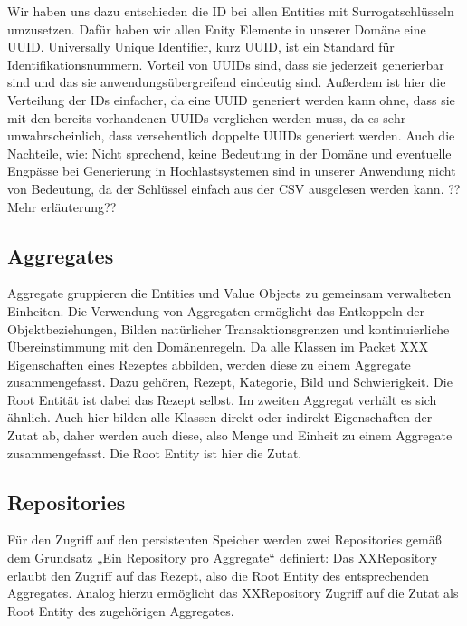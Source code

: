 Wir haben uns dazu entschieden die ID bei allen Entities mit Surrogatschlüsseln umzusetzen. Dafür haben wir allen Enity Elemente in unserer Domäne eine UUID. Universally Unique Identifier, kurz UUID, ist ein Standard für Identifikationsnummern. Vorteil von UUIDs sind, dass sie jederzeit generierbar sind und das sie anwendungsübergreifend eindeutig sind. Außerdem ist hier die Verteilung der IDs einfacher, da eine UUID generiert werden kann ohne, dass sie mit den bereits vorhandenen UUIDs verglichen werden muss, da  es sehr unwahrscheinlich, dass versehentlich doppelte UUIDs generiert werden. Auch die Nachteile, wie: Nicht sprechend, keine Bedeutung in der Domäne und eventuelle Engpässe bei Generierung in
Hochlastsystemen sind in unserer Anwendung nicht von Bedeutung, da der Schlüssel einfach aus der CSV ausgelesen werden kann. ??Mehr erläuterung??

\subsection{Aggregates}
Aggregate gruppieren die Entities und Value Objects zu gemeinsam verwalteten Einheiten. Die Verwendung von Aggregaten ermöglicht das Entkoppeln der Objektbeziehungen, Bilden natürlicher Transaktionsgrenzen und kontinuierliche Übereinstimmung mit den Domänenregeln. 
Da alle Klassen im Packet XXX Eigenschaften eines Rezeptes abbilden, werden diese zu einem Aggregate zusammengefasst. Dazu gehören, Rezept, Kategorie, Bild und Schwierigkeit. Die Root Entität ist dabei das Rezept selbst. Im zweiten Aggregat verhält es sich ähnlich. Auch hier bilden alle Klassen direkt oder indirekt Eigenschaften der Zutat ab, daher werden auch diese, also Menge und Einheit zu einem Aggregate zusammengefasst. Die Root Entity ist hier die Zutat.

\subsection{Repositories}
Für den Zugriff auf den persistenten Speicher werden zwei Repositories gemäß dem Grundsatz „Ein Repository pro Aggregate“ definiert: Das XXRepository erlaubt den Zugriff auf das Rezept, also die Root Entity des entsprechenden Aggregates. Analog hierzu
ermöglicht das XXRepository Zugriff auf die Zutat als Root Entity des zugehörigen Aggregates.
